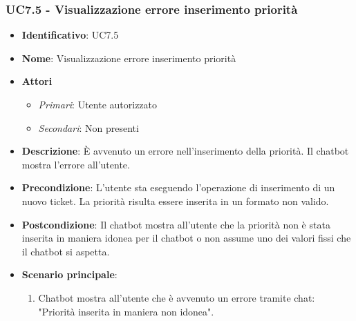 \subsubsection{UC7.5 - Visualizzazione errore inserimento priorità}
\begin{itemize}
	\item \textbf{Identificativo}: UC7.5
	\item \textbf{Nome}:  Visualizzazione errore inserimento priorità
	\item \textbf{Attori}
	\begin{itemize} 
		\item \textit{Primari}: Utente autorizzato
		\item \textit{Secondari}: Non presenti
	\end{itemize}
	\item \textbf{Descrizione}: È avvenuto un errore nell'inserimento della priorità. Il chatbot mostra l'errore all'utente.
	\item \textbf{Precondizione}: L'utente sta eseguendo l'operazione di inserimento di un nuovo ticket. La priorità risulta essere inserita in un formato non valido. 
	\item \textbf{Postcondizione}: Il chatbot mostra all'utente che la priorità non è stata inserita in maniera idonea per il chatbot o non assume uno dei valori fissi che il chatbot si aspetta.
	\item \textbf{Scenario principale}: \begin{enumerate}
		\item Chatbot mostra all'utente che è avvenuto un errore tramite chat: "Priorità inserita in maniera non idonea".
	\end{enumerate}
\end{itemize}